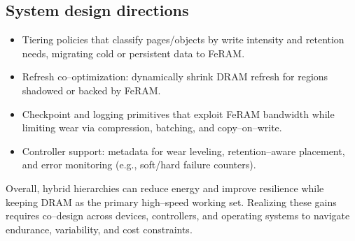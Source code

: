 \subsection*{System design directions}
\begin{itemize}
  \item Tiering policies that classify pages/objects by write intensity and retention needs, migrating cold or persistent data to FeRAM.
  \item Refresh co--optimization: dynamically shrink DRAM refresh for regions shadowed or backed by FeRAM.
  \item Checkpoint and logging primitives that exploit FeRAM bandwidth while limiting wear via compression, batching, and copy--on--write.
  \item Controller support: metadata for wear leveling, retention--aware placement, and error monitoring (e.g., soft/hard failure counters).
\end{itemize}

Overall, hybrid hierarchies can reduce energy and improve resilience while keeping DRAM as the primary high--speed working set. Realizing these gains requires co--design across devices, controllers, and operating systems to navigate endurance, variability, and cost constraints.
